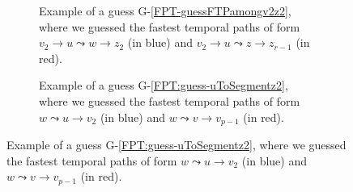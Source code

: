 \documentclass[a4paper,UKenglish,cleveref, autoref, thm-restate]{lipics-v2021}
\begin{document}
%
\begin{figure}[t]
    \centering
	\begin{subfigure}[b]{0.48\textwidth}
		\centering
	\caption{Example of a guess G-\ref{FPT-guessFTPamongv2z2}, where we guessed the fastest temporal paths of form $v_2 \rightarrow u \leadsto w \rightarrow z_2$ (in blue)
	and $v_2 \rightarrow u \leadsto z \rightarrow z_{r-1}$ (in red).
	\label{fig:FPT-guessG4}}
	\end{subfigure}
	\quad
	\begin{subfigure}[b]{0.48\textwidth}
		\centering
		\caption{Example of a guess G-\ref{FPT:guess-uToSegmentz2}, where we guessed the fastest temporal paths of form $w \leadsto u \rightarrow v_2$ (in blue) and $w \leadsto v \rightarrow v_{p-1}$ (in red). 
			\label{fig:FPT-guessG5}}
	\end{subfigure}
	

\end{figure}
\end{document}
